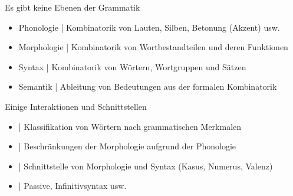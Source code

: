 \begin{frame}
  {Es gibt keine }
  \onslide<+->
  \onslide<+->
  Ebenen der Grammatik\\
  \Viertelzeile
  \begin{itemize}[<+->]
    \item \alert{Phonologie} | Kombinatorik von Lauten, Silben, Betonung (Akzent) usw.
    \item \alert{Morphologie} | Kombinatorik von Wortbestandteilen und deren Funktionen
    \item \alert{Syntax} | Kombinatorik von Wörtern, Wortgruppen und Sätzen
    \item \alert{Semantik} | Ableitung von Bedeutungen aus der formalen Kombinatorik
  \end{itemize}
  \onslide<+->
  \Zeile
  Einige Interaktionen und Schnittstellen\\
  \Viertelzeile
  \begin{itemize}[<+->]
    \item {} | Klassifikation von Wörtern nach \alert{grammatischen Merkmalen}
    \item {} | Beschränkungen der \alert{Morphologie} aufgrund der \alert{Phonologie} 
    \item {} | Schnittstelle von Morphologie und Syntax (Kasus, Numerus, Valenz)
    \item {} | Passive, Infinitivsyntax usw.
  \end{itemize}
  \onslide<+->
  \Halbzeile
\end{frame}

